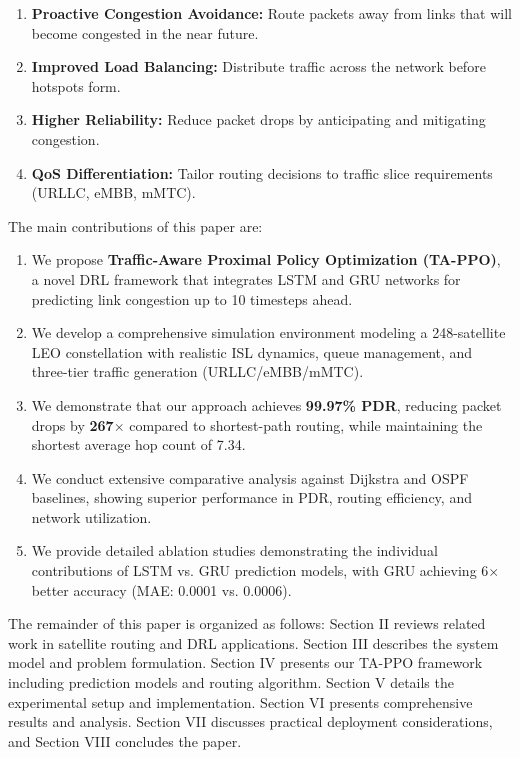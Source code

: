 \documentclass[journal]{IEEEtran}
\begin{document}
\begin{enumerate}
\item \textbf{Proactive Congestion Avoidance:} Route packets away from links that will become congested in the near future.
\item \textbf{Improved Load Balancing:} Distribute traffic across the network before hotspots form.
\item \textbf{Higher Reliability:} Reduce packet drops by anticipating and mitigating congestion.
\item \textbf{QoS Differentiation:} Tailor routing decisions to traffic slice requirements (URLLC, eMBB, mMTC).
\end{enumerate}

The main contributions of this paper are:

\begin{enumerate}
\item We propose \textbf{Traffic-Aware Proximal Policy Optimization (TA-PPO)}, a novel DRL framework that integrates LSTM and GRU networks for predicting link congestion up to 10 timesteps ahead.

\item We develop a comprehensive simulation environment modeling a 248-satellite LEO constellation with realistic ISL dynamics, queue management, and three-tier traffic generation (URLLC/eMBB/mMTC).

\item We demonstrate that our approach achieves \textbf{99.97\% PDR}, reducing packet drops by \textbf{267$\times$} compared to shortest-path routing, while maintaining the shortest average hop count of 7.34.

\item We conduct extensive comparative analysis against Dijkstra and OSPF baselines, showing superior performance in PDR, routing efficiency, and network utilization.

\item We provide detailed ablation studies demonstrating the individual contributions of LSTM vs. GRU prediction models, with GRU achieving 6$\times$ better accuracy (MAE: 0.0001 vs. 0.0006).
\end{enumerate}

The remainder of this paper is organized as follows: Section II reviews related work in satellite routing and DRL applications. Section III describes the system model and problem formulation. Section IV presents our TA-PPO framework including prediction models and routing algorithm. Section V details the experimental setup and implementation. Section VI presents comprehensive results and analysis. Section VII discusses practical deployment considerations, and Section VIII concludes the paper.
\end{document}
